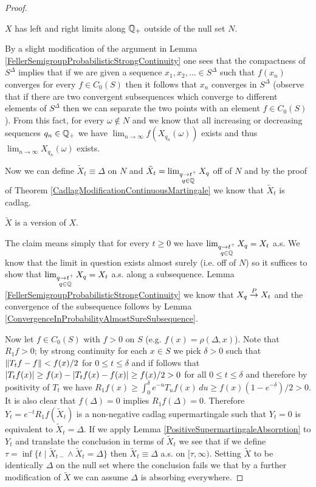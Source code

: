 \begin{proof}
\begin{clm} $X$ has left and right limits along $\mathbb{Q}_+$ outside of the null set $N$.
\end{clm}
By a slight modification of the argument in Lemma \ref{FellerSemigroupProbabilisticStrongContinuity} one sees that the compactness of $S^\Delta$ implies that if we are given
a sequence $x_1, x_2, \dotsc \in S^\Delta$ such that $f(x_n)$ converges for every $f \in C_0(S)$ then it follows that $x_n$ converges in $S^\Delta$ (observe that if there are two convergent subsequences which converge to different elements of $S^\Delta$ then we can separate the two points with an element $f \in C_0(S)$).  From this fact, for every $\omega \notin N$ and we know that all increasing or decreasing sequences $q_n \in \mathbb{Q}_+$ we have $\lim_{n \to \infty} f(X_{q_n}(\omega))$ exists and thus $\lim_{n \to \infty} X_{q_n}(\omega)$ exists.

Now we can define $\tilde{X}_t \equiv \Delta$ on $N$ and $\tilde{X}_t = \lim_{\substack{q \to t^+ \\ q \in \mathbb{Q}}} X_q$ off of $N$ and by the proof of Theorem \ref{CadlagModificationContinuousMartingale} we know that $\tilde{X}_t$ is cadlag.  
\begin{clm} $\tilde{X}$ is a version of $X$.
\end{clm}
The claim means simply that for every $t \geq 0$ we have $\lim_{\substack{q \to t^+ \\ q \in \mathbb{Q}}} X_q =X_t$ a.s. We know that the limit in question exists almost surely (i.e. off of $N$) so it suffices to show that $\lim_{\substack{q \to t^+ \\ q \in \mathbb{Q}}} X_q =X_t$ a.s. along a subsequence.  Lemma \ref{FellerSemigroupProbabilisticStrongContinuity} we know that $X_q \overset{P}\to X_t$ and the convergence of the subsequence follows by Lemma \ref{ConvergenceInProbabilityAlmostSureSubsequence}.

Now let $f \in C_0(S)$ with $f > 0$ on $S$ (e.g. $f(x) = \rho(\Delta, x)$).  Note that $R_1 f > 0$; by strong continuity for each $x \in S$ we pick $\delta>0$ such that $\left \lVert T_t f - f \right \rVert < f(x)/2$ for $0 \leq t \leq \delta$ and if follows that $\left \vert T_t f(x) \right \vert \geq  f(x) - \left \vert T_tf(x) - f(x) \right \vert  \geq f(x)/2 > 0$ for all $0  \leq t \leq \delta$ and therefore by positivity of $T_t$ we have $R_1 f (x) \geq \int_0^\delta e^{-u} T_u f(x) \, du \geq f(x)(1-e^{-\delta})/2 > 0$.  It is also clear that $f(\Delta) = 0$ implies $R_1 f(\Delta) = 0$.  Therefore $Y_t = e^{-t} R_1 f(\tilde{X}_t)$ is a non-negative cadlag supermartingale such that $Y_t = 0$ is equivalent to $\tilde{X}_t = \Delta$.  If we apply Lemma \ref{PositiveSupermartingaleAbsorption} to $Y_t$ and translate the conclusion in terms of $\tilde{X}_t$ we see that if we define $\tau = \inf \lbrace t \mid \tilde{X}_{t-} \wedge \tilde{X}_t =\Delta \rbrace$ then $\tilde{X}_t \equiv \Delta$ a.s. on $[\tau, \infty)$.  Setting $\tilde{X}$ to be identically $\Delta$ on the null set where the conclusion fails we that by a further modification of $\tilde{X}$ we can assume $\Delta$ is absorbing everywhere.


\end{proof}

